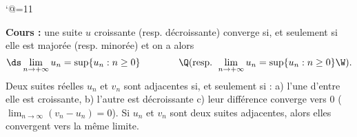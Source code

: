 \catcode`@=11\relax


\vglue-10mm
\bigskip\noindent
{\bf Cours : }une suite $u$ croissante (resp. d\'ecroissante) converge si, et seulement si elle est major\'ee (resp. minor\'ee) et on a alors 
$$
\ds\lim_{n\to+\infty}u_n=\sup\{u_n:n\ge0\}\qquad\qquad\Q (\hbox{resp. }\lim_{n\to+\infty}u_n=\sup\{u_n:n\ge0\}\W).
$$ 
Deux suites r\'eelles $u_n$ et $v_n$ sont adjacentes si, et seulement si : \pn
a) l'une d'entre elle est croissante, \pn 
b) l'autre est d\'ecroissante\pn 
c) leur diff\'erence converge vers $0$ ($\lim_{n\to\infty}(v_n-u_n)=0$). 
\bigskip\noindent
Si $u_n$ et $v_n$ sont deux suites adjacentes, alors elles convergent vers la m\^eme limite. 
\bigskip
\bigskip
{}
\vfill
{}
\vfill
{}
\vfill
{}
\vfill
{}
\vfill
{}
\bye
